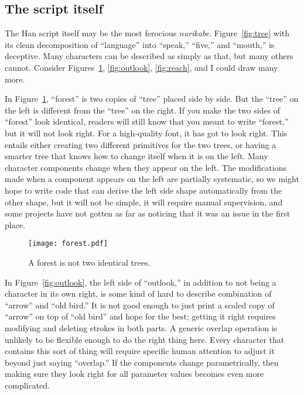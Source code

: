 \documentclass{ltugboat}
\begin{document}
\subsection{The script itself}

The Han script itself may be the most ferocious \emph{nurikabe}. 
Figure~\ref{fig:tree} with its clean decomposition of ``language'' into
``speak,'' ``five,'' and ``mouth,'' is deceptive.  Many characters can be
described as simply as that, but many others cannot.  Consider
Figures~\ref{fig:forest}, \ref{fig:outlook}, \ref{fig:reach}, and I could
draw many more.

In Figure~\ref{fig:forest}, ``forest'' is two copies of ``tree'' placed side
by side.  But the ``tree'' on the left is different from the ``tree'' on the
right.  If you make the two sides of ``forest'' look identical, readers will
still know that you meant to write ``forest,'' but it will not look right. 
For a high-quality font, it has got to look right.  This entails either
creating two different primitives for the two trees, or having a smarter
tree that knows how to change itself when it is on the left.  Many character
components change when they appear on the left.  The modifications made when
a component appears on the left are partially systematic, so we might hope
to write code that can derive the left side shape automatically from the
other shape, but it will not be simple, it will require manual supervision,
and some projects have not gotten as far as noticing that it was an
issue in the first place.

\begin{figure}
\texttt{[image: forest.pdf]}
\caption{A forest is not two identical trees.}
\label{fig:forest}
\vskip-1mm%
\end{figure}

In Figure~\ref{fig:outlook}, the left side of ``outlook,'' in addition to
not being a character in its own right, is some kind of hard to describe
combination of ``arrow'' and ``old bird.'' It is not good enough to just
print a scaled copy of ``arrow'' on top of ``old bird'' and hope for the
best; getting it right requires modifying and deleting strokes in both
parts.  A generic overlap operation is unlikely to be flexible enough to do
the right thing here.  Every character that contains this sort of thing will
require specific human attention to adjust it beyond just saying
``overlap.'' If the components change parametrically, then making sure they
look right for all parameter values becomes even more complicated.
\end{document}
